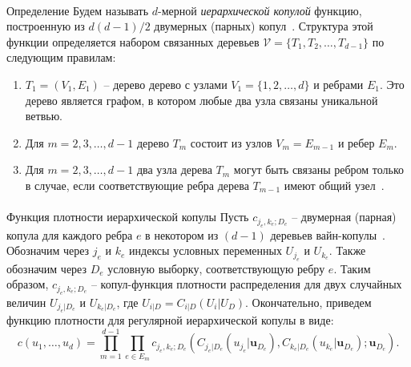 \documentclass[aspectratio=169]{beamer}
\begin{document}
\begin{frame}{\insertsection}
    \framesubtitle{\insertsubsection}
    \begin{block}{Определение}
        Будем называть $d$-мерной \textit{иерархической копулой} функцию, построенную из $d(d - 1)/2$  двумерных (парных) копул~\cite{Bedfort2002}. 
        Структура этой функции определяется набором связанных деревьев $\mathcal{V} =\{T_1, T_2, \ldots, T_ {d-1}\}$ по следующим правилам:
        \begin{enumerate}[(1)]
            \item $T_1 = (V_1, E_1)$ -- дерево дерево с узлами $V_1 = \{1, 2, \ldots, d\}$ и ребрами $E_1$. 
            Это дерево является графом, в котором любые два узла связаны уникальной ветвью.
            \item Для $m = 2, 3,\ldots,d - 1$ дерево $T_m$ состоит из узлов $V_m = E_{m-1}$ и ребер $E_m$.
            \item Для $m = 2, 3,\ldots, d - 1$ два узла дерева $T_m$ могут быть связаны ребром только в случае, если соответствующие ребра дерева $T_{m-1}$ имеют общий узел~\cite{Czado2010}.
        \end{enumerate}
    \end{block}
\end{frame}

\begin{frame}{\insertsection}
    \framesubtitle{\insertsubsection}
    \begin{block}{Функция плотности иерархической копулы}
        Пусть $c_{j_e, k_e; D_e}$ -- двумерная (парная) копула для каждого ребра $e$ в некотором из $(d - 1)$ деревьев вайн-копулы~\cite{Czado2010}. 
        Обозначим через $j_e$ и $k_e$ индексы условных переменных $U_{j_e}$ и $U_{k_e}$. 
        Также обозначим через $D_e$ условную выборку, соответствующую ребру $e$. 
        Таким образом, $c_{j_e, k_e; D_e}$ -- копул-функция плотности распределения для двух случайных величин $U_{j_e|D_e}$ и $U_{k_e|D_e}$, где $U_{i|D} = C_{i|D} (U_i|U_D)$. 
        Окончательно, приведем функцию плотности для регулярной иерархической копулы в виде:
        \begin{equation}
            c(u_1, \ldots, u_d) = \prod_{m=1}^{d-1} \prod_{e \in E_m} c_{j_e,k_e;D_e} \left( C_{j_e|D_e} (u_{j_e}|\textbf{u}_{D_e}), C_{k_e|D_e} (u_{k_e}|\textbf{u}_{D_e}); \textbf{u}_{D_e} \right).
        \end{equation}
    \end{block}
\end{frame}
\end{document}
